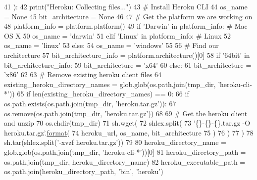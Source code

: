 \begin{DoxyCode}
41 ):
42     print(\textcolor{stringliteral}{"Heroku: Collecting files..."})
43     \textcolor{comment}{# Install Heroku CLI}
44     os\_name = \textcolor{keywordtype}{None}
45     bit\_architecture = \textcolor{keywordtype}{None}
46 
47     \textcolor{comment}{# Get the platform we are working on}
48     platform\_info = platform.platform()
49     \textcolor{keywordflow}{if} \textcolor{stringliteral}{'Darwin'} \textcolor{keywordflow}{in} platform\_info:  \textcolor{comment}{# Mac OS X}
50         os\_name = \textcolor{stringliteral}{'darwin'}
51     \textcolor{keywordflow}{elif} \textcolor{stringliteral}{'Linux'} \textcolor{keywordflow}{in} platform\_info:  \textcolor{comment}{# Linux}
52         os\_name = \textcolor{stringliteral}{'linux'}
53     \textcolor{keywordflow}{else}:
54         os\_name = \textcolor{stringliteral}{'windows'}
55 
56     \textcolor{comment}{# Find our architecture}
57     bit\_architecture\_info = platform.architecture()[0]
58     \textcolor{keywordflow}{if} \textcolor{stringliteral}{'64bit'} \textcolor{keywordflow}{in} bit\_architecture\_info:
59         bit\_architecture = \textcolor{stringliteral}{'x64'}
60     \textcolor{keywordflow}{else}:
61         bit\_architecture = \textcolor{stringliteral}{'x86'}
62 
63     \textcolor{comment}{# Remove existing heroku client files}
64     existing\_heroku\_directory\_names = glob.glob(os.path.join(tmp\_dir, \textcolor{stringliteral}{'heroku-cli-*'}))
65     \textcolor{keywordflow}{if} len(existing\_heroku\_directory\_names) == 0:
66         \textcolor{keywordflow}{if} os.path.exists(os.path.join(tmp\_dir, \textcolor{stringliteral}{'heroku.tar.gz'})):
67             os.remove(os.path.join(tmp\_dir, \textcolor{stringliteral}{'heroku.tar.gz'}))
68 
69         \textcolor{comment}{# Get the heroku client and unzip}
70         os.chdir(tmp\_dir)
71         sh.wget(
72             shlex.split(
73                 \textcolor{stringliteral}{'\{\}-\{\}-\{\}.tar.gz -O heroku.tar.gz'}.\hyperlink{namespaceparlai_1_1chat__service_1_1services_1_1messenger_1_1shared__utils_a32e2e2022b824fbaf80c747160b52a76}{format}(
74                     heroku\_url, os\_name, bit\_architecture
75                 )
76             )
77         )
78         sh.tar(shlex.split(\textcolor{stringliteral}{'-xvzf heroku.tar.gz'}))
79 
80     heroku\_directory\_name = glob.glob(os.path.join(tmp\_dir, \textcolor{stringliteral}{'heroku-cli-*'}))[0]
81     heroku\_directory\_path = os.path.join(tmp\_dir, heroku\_directory\_name)
82     heroku\_executable\_path = os.path.join(heroku\_directory\_path, \textcolor{stringliteral}{'bin'}, \textcolor{stringliteral}{'heroku'})

\end{DoxyCode}
